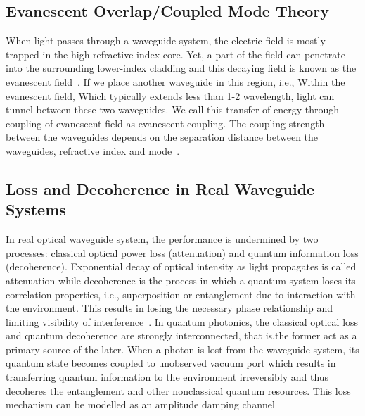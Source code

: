 \subsection{Evanescent Overlap/Coupled Mode Theory}
When light passes through a waveguide system, the electric field is mostly trapped in the high-refractive-index core. Yet, a part of the field can penetrate into the surrounding lower-index cladding and this decaying field is known as the evanescent field~\cite{Marcuse1974,Ihn2020}. If we place another waveguide in this region, i.e., Within the evanescent field, Which typically extends less than 1-2 wavelength, light can tunnel between these two waveguides. We call this transfer of energy through coupling of evanescent field as evanescent coupling. The coupling strength between the waveguides depends on the separation distance between the waveguides, refractive index and mode~\cite{Yariv1973}.

\subsection{Loss and Decoherence in Real Waveguide Systems}
In real optical waveguide system, the performance is undermined by two processes: classical optical power loss (attenuation) and quantum information loss (decoherence). Exponential decay of optical intensity as light propagates is called attenuation while decoherence is the process in which a quantum system loses its correlation properties, i.e., superposition or entanglement due to interaction with the environment. This results in losing the necessary phase relationship and limiting visibility of interference~\cite{BourassinBouchetEtAl2020,BreuerPetruccione2002,Yariv1973}.
In quantum photonics, the classical optical loss and quantum decoherence are strongly interconnected, that is,the former act as a primary source of the later. When a photon is lost from the waveguide system, its quantum state becomes coupled to unobserved vacuum port which results in transferring quantum information to the environment irreversibly and thus decoheres the entanglement and other nonclassical quantum resources. This loss mechanism can be modelled as an amplitude damping channel~\cite{BreuerPetruccione2002,ChenLiuKoehlerTabatabaeiGuoSunYangWangBelingYi2025}
